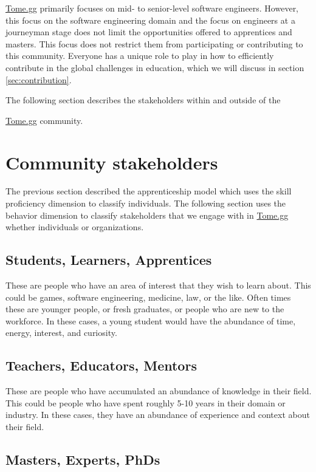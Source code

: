 \documentclass[conference]{IEEEtran}
\newcommand{\tomegg}{
  \href{http://tome.gg}{Tome.gg}
}
\begin{document}
\tomegg primarily focuses on mid- to senior-level software engineers. However, 
this focus on the software engineering domain and the focus on engineers at a
journeyman stage does not limit the opportunities offered to apprentices and 
masters. This focus does not restrict them from participating or contributing 
to this community. Everyone has a unique role to play in how to efficiently 
contribute in the global challenges in education, which we will discuss in 
section \ref{sec:contribution}.

The following section describes the stakeholders within and outside of the
\tomegg community.

\section{Community stakeholders}
\label{sec:stakeholders}

The previous section described the apprenticeship model which uses the 
skill proficiency dimension to classify individuals.
The following section uses the behavior dimension to classify stakeholders
that we engage with in \tomegg whether individuals or organizations.

\subsection{Students, Learners, Apprentices}

These are people who have an area of interest that they wish to learn
about. This could be games, software engineering, medicine, law, or the like.
Often times these are younger people, or fresh graduates, or people who are
new to the workforce. In these cases, a young student would have the abundance of 
time, energy, interest, and curiosity.

\subsection{Teachers, Educators, Mentors}

These are people who have accumulated an abundance of knowledge in their field.
This could be people who have spent roughly 5-10 years in their domain or industry.
In these cases, they have an abundance of experience and context about their
field.

\subsection{Masters, Experts, PhDs}
\end{document}
